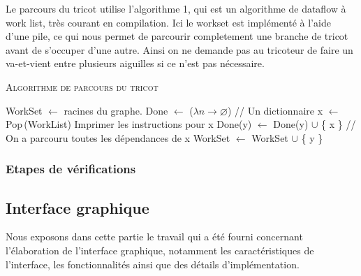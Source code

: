 \documentclass{article}
\begin{document}
Le parcours du tricot utilise l'algorithme 1, qui est un algorithme de
dataflow à work list, très courant en compilation. Ici le workset est
implémenté à l'aide d'une pile, ce qui nous permet de parcourir
completement une branche de tricot avant de s'occuper d'une
autre. Ainsi on ne demande pas au tricoteur de faire un va-et-vient
entre plusieurs aiguilles si ce n'est pas nécessaire.

\begin{algorithm}\label{algo}
\caption{\textsc{Algorithme de parcours du tricot}}
\begin{algorithmic}[1]
\State WorkSet $\leftarrow$ racines du graphe.
\State Done $\leftarrow$ ($\lambda n \to \varnothing$) // Un dictionnaire
  \State x $\leftarrow$ Pop\,(WorkList)
  \State Imprimer les instructions pour x
    \State Done(y) $\leftarrow$ Done(y) $\cup$ \{ x \}
     // On a parcouru toutes les dépendances de x
      \State WorkSet $\leftarrow$ WorkSet $\cup$ \{ y \}
    \EndIf
  \EndFor


\EndWhile

\end{algorithmic}
\end{algorithm}

\subsubsection{Etapes de vérifications}

\subsection{Interface graphique}

Nous exposons dans cette partie le travail qui a été fourni concernant
l'élaboration de l'interface graphique, notamment les caractéristiques
de l'interface, les fonctionnalités ainsi que des détails
d'implémentation.
\end{document}
